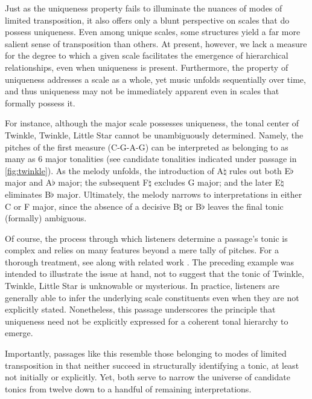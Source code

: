 \documentclass[10pt,twocolumn]{article}
\numberwithin{equation}{section} %
\begin{document}
    Just as the uniqueness property fails to illuminate the nuances of modes of limited transposition, it also offers only a blunt perspective on scales that do possess uniqueness.
    Even among unique scales, some structures yield a far more salient sense of transposition than others.
    At present, however, we lack a measure for the degree to which a given scale facilitates the emergence of hierarchical relationships, even when uniqueness is present.
    Furthermore, the property of uniqueness addresses a scale as a whole, yet music unfolds sequentially over time, and thus uniqueness may not be immediately apparent even in scales that formally possess it.

    For instance, although the major scale possesses uniqueness, the tonal center of Twinkle, Twinkle, Little Star cannot be unambiguously determined.
    Namely, the pitches of the first measure (C-G-A-G) can be interpreted as belonging to as many as 6 major tonalities (see candidate tonalities indicated under passage in \autoref{fig:twinkle}).
    As the melody unfolds, the introduction of A$\natural$ rules out both E$\flat$ major and A$\flat$ major; the subsequent F$\natural$ excludes G major; and the later E$\natural$ eliminates B$\flat$ major.
    Ultimately, the melody narrows to interpretations in either C or F major, since the absence of a decisive B$\natural$ or B$\flat$ leaves the final tonic (formally) ambiguous.

    Of course, the process through which listeners determine a passage's tonic is complex and relies on many features beyond a mere tally of pitches. For a thorough treatment, see \citet{LerdahlJackendoff1983} along with related work \citep{BharuchaKrumhansl1983,Lerdahl2004,Patel1998,Thompson1997}.
    The preceding example was intended to illustrate the issue at hand, not to suggest that the tonic of Twinkle, Twinkle, Little Star is unknowable or mysterious.
    In practice, listeners are generally able to infer the underlying scale constituents even when they are not explicitly stated.
    Nonetheless, this passage underscores the principle that uniqueness need not be explicitly expressed for a coherent tonal hierarchy to emerge.

    Importantly, passages like this resemble those belonging to modes of limited transposition in that neither succeed in structurally identifying a tonic, at least not initially or explicitly.
    Yet, both serve to narrow the universe of candidate tonics from twelve down to a handful of remaining interpretations.
\end{document}
